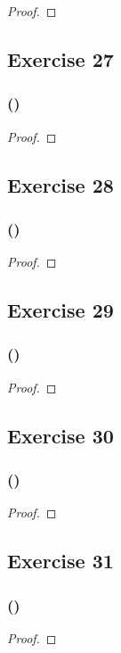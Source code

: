 \documentclass[14pt]{extarticle}
\begin{document}
\begin{proof}

\end{proof}

\subsection{Exercise 27}

\subsubsection{()}

\begin{proof}

\end{proof}

\subsection{Exercise 28}

\subsubsection{()}

\begin{proof}

\end{proof}

\subsection{Exercise 29}

\subsubsection{()}

\begin{proof}

\end{proof}

\subsection{Exercise 30}

\subsubsection{()}

\begin{proof}

\end{proof}

\subsection{Exercise 31}

\subsubsection{()}

\begin{proof}

\end{proof}
\end{document}
